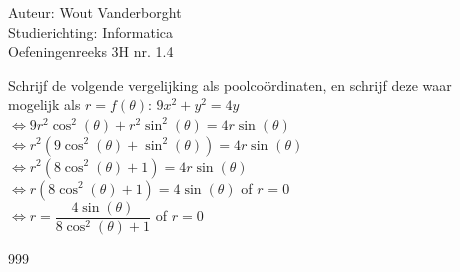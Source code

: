 \documentclass[a4paper]{article}
\begin{document}
  
\noindent \large Auteur: Wout Vanderborght\\
\noindent \large Studierichting: Informatica\\
\noindent \large Oefeningenreeks 3H nr. 1.4\\

\medskip

\normalsize

Schrijf de volgende vergelijking als poolcoördinaten, en schrijf deze waar \\

mogelijk als $r = f(\theta)$: $9x^2 + y^2 = 4y$ \\

$ \Leftrightarrow 9r^2\cos^2(\theta) + r^2\sin^2(\theta) = 4r\sin(\theta)$ \\

$ \Leftrightarrow r^2(9\cos^2(\theta) + \sin^2(\theta)) = 4r\sin(\theta)$ \\

$ \Leftrightarrow r^2(8\cos^2(\theta) + 1) = 4r\sin(\theta)$ \\

$ \Leftrightarrow r(8\cos^2(\theta) + 1) = 4\sin(\theta)$ of $r = 0$ \\

$ \Leftrightarrow r = \dfrac{4\sin(\theta)}{8\cos^2(\theta) + 1}$ of $r = 0$ \\

\begin{thebibliography}{999}
\end{thebibliography}
\end{document}
